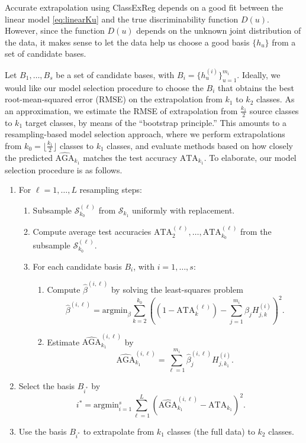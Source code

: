 \documentclass[twoside,11pt]{article}
\newcommand{\argmin}{\text{argmin}}
\begin{document}
Accurate extrapolation using ClassExReg depends on a good
fit between the linear model \eqref{eq:linearKu} and the true
discriminability function $D(u)$.  However, since the function $D(u)$
depends on the unknown joint distribution of the data, it makes sense
to let the data help us choose a good basis $\{h_u\}$ from a set of
candidate bases.

Let $B_1,\hdots, B_s$ be a set of candidate bases, with $B_i = \{h_u^{(i)}\}_{u=1}^{m_i}$.  Ideally, we would like our model selection procedure to choose the $B_i$ that obtains the best root-mean-squared error (RMSE) on the extrapolation from $k_1$ to $k_2$ classes.  As an approximation, we estimate the RMSE of extrapolation from $\frac{k_1}{2}$ source classes to $k_1$ target classes, by means of the ``bootstrap principle.''  This amounts to a resampling-based model selection approach, where we perform extrapolations from $k_0 = \lfloor \frac{k_1}{2} \rfloor$ classes to $k_1$ classes, and evaluate methods based on how closely the predicted $\widehat{\text{AGA}}_{k_1}$ matches the test accuracy $\text{ATA}_{k_1}$.  To elaborate, our model selection procedure is as follows.

\begin{enumerate}
\item For $\ell=1,\hdots,L$ resampling steps:
\begin{enumerate}
\item Subsample $\mathcal{S}_{k_0}^{(\ell)}$ from $\mathcal{S}_{k_1}$ uniformly with replacement.
\item Compute average test accuracies $\text{ATA}_{2}^{(\ell)},\hdots,\text{ATA}_{k_0}^{(\ell)}$ from the subsample $\mathcal{S}_{k_0}^{(\ell)}$.
\item For each candidate basis $B_i$, with $i = 1,\hdots, s$:
\begin{enumerate}
\item Compute $\hat{\beta}^{(i,\ell)}$ by solving the least-squares problem
\[\hat{\beta}^{(i,\ell)} = \argmin_\beta \sum_{k=2}^{k_0} \left( (1 - \text{ATA}_k^{(\ell)}) - \sum_{j=1}^{m_i} \beta_j H_{j, k}^{(i)}\right)^2.\]
\item Estimate $\widehat{\text{AGA}}_{k_1}^{(i,\ell)}$ by
\[
\widehat{\text{AGA}}_{k_1}^{(i,\ell)} = \sum_{\ell=1}^{m_i} \hat{\beta}_j^{(i,\ell)} H_{j, k_1}^{(i)}.
\]
\end{enumerate}
\end{enumerate}
\item Select the basis $B_{i^*}$ by
\[
i^* = \text{argmin}_{i=1}^s \sum_{\ell=1}^L (\widehat{\text{AGA}}_{k_1}^{(i,\ell)} - \text{ATA}_{k_1})^2.
\]
\item Use the basis $B_{i^*}$ to extrapolate from $k_1$ classes (the full data) to $k_2$ classes.
\end{enumerate}
\end{document}

